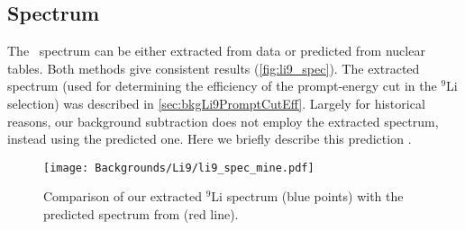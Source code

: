 \documentclass[../thesis.tex]{subfiles}
\begin{document}
\begin{comment}
- forming and fitting the histogram %
- - Detail the cuts we use for different muon energy ranges (prompt energy, neutron tag)
- Prompt cut efficiency
- - Extraction of spectrum. Subtraction of IBD spectrum.
- - Uncertainty
- - - Statistical - binomial confidence interval accounting for error bars on subtracted spectrum => 1-2\% (See if can find how Chris did it in code... sounds tricky)
- - - Systematic - Variations in time binning, muon PE cut in background sample => 1\%
- Neutron tag efficiency
- - Uncertainty - 45\% according to doc-10920
- - Nominal value of... 80\%? 60\%?
- Uncertainty from fit
- - Neutron tagging cutoff - 1.5e5 to 1.8e5 => 10\% (NOT IN CHRIS'S TABLE)
- - Binning => <5\% (NOT IN CHRIS'S TABLE) (MENTIONED AT END)
- - B12 => 8\%
- - He8 => 4\%
- Uncertainty of shower veto correction (He8 fraction)
- - Vary He8 fraction from 0 to 15\%
- Conversion from fit result to daily rate
- - Efficiencies of Li9 selection (ntag, pcut)
- - IBD selection efficiencies (veto, mult)
- - Shower veto correction
- - Propagation of uncertainties
\end{comment}

\subsection{Spectrum}
\label{sec:bkgLi9Spectrum}

The \LiHe\ spectrum can be either extracted from data or predicted from nuclear tables. Both methods give consistent results (\autoref{fig:li9_spec}). The extracted spectrum (used for determining the efficiency of the prompt-energy cut in the $^9$Li selection) was described in \autoref{sec:bkgLi9PromptCutEff}. Largely for historical reasons, our background subtraction does not employ the extracted spectrum, instead using the predicted one. Here we briefly describe this prediction \cite{pedroLi9Spec1,pedroLi9Spec2}.

\begin{figure}[h]
  \texttt{[image: Backgrounds/Li9/li9\_spec\_mine.pdf]}
  \caption{Comparison of our extracted $^9$Li spectrum (blue points) with the predicted spectrum from \cite{pedroLi9Spec1,pedroLi9Spec2} (red line).}
  \label{fig:li9_spec}
\end{figure}
\end{document}
